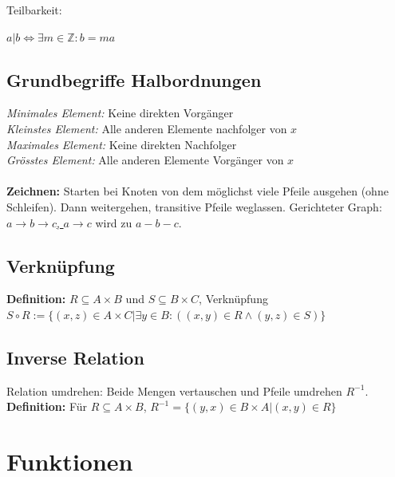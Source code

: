 \documentclass[8pt,landscape]{scrartcl}
\begin{document}
\begin{multicols}{3}
\begin{bf}Teilbarkeit:\end{bf} $a|b \iff \exists m \in \mathbb{Z} : b = ma$

\subsection{Grundbegriffe Halbordnungen}
\textit{Minimales Element:} Keine direkten Vorg\"anger\\
\textit{Kleinstes Element:} Alle anderen Elemente nachfolger von $x$\\
\textit{Maximales Element:} Keine direkten Nachfolger\\
\textit{Gr\"osstes Element:} Alle anderen Elemente Vorg\"anger von $x$\\\\
\textbf{Zeichnen:} Starten bei Knoten von dem m\"oglichst viele Pfeile ausgehen (ohne Schleifen).
Dann weitergehen, transitive Pfeile weglassen.
Gerichteter Graph: \underline{$a \rightarrow b \rightarrow c$, $a \rightarrow c$} wird zu $a - b - c$.

\subsection{Verkn\"upfung}
\textbf{Definition:} $R \subseteq A \times B$ und $S \subseteq B \times C$, Verkn\"upfung\\
$S \circ R := \{ (x, z) \in A \times C | \exists y \in B : ( (x, y) \in R \land (y, z) \in S ) \}$

\subsection{Inverse Relation}
Relation umdrehen: Beide Mengen vertauschen und Pfeile umdrehen $R^{-1}$.\\
\textbf{Definition:} F\"ur $R \subseteq A \times B$, $R^{-1} = \{ (y, x) \in B \times A | (x, y) \in R \}$




\section{Funktionen}


\end{multicols}
\end{document}

